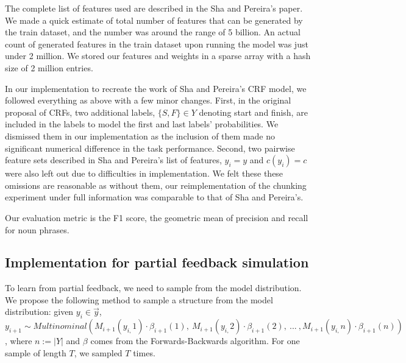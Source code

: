 \documentclass{article}
\begin{document}
The complete list of features used are described in the Sha and Pereira's paper. We made a quick estimate of total number of features that can be generated by the train dataset, and the number was around the range of 5 billion. An actual count of generated features in the train dataset upon running the model was just under 2 million. We stored our features and weights in a sparse array with a hash size of 2 million entries.

In our implementation to recreate the work of Sha and Pereira's CRF model, we followed everything as above with a few minor changes. First, in the original proposal of CRFs, two additional labels, $\{S, F\}\in Y$ denoting start and finish, are included in the labels to model the first and last labels' probabilities.  We dismissed them in our implementation as the inclusion of them made no significant numerical difference in the task performance. Second, two pairwise feature sets described in Sha and Pereira's list of features, $y_{i}=y$ and $c(y_{i})=c$ were also left out due to difficulties in implementation. We felt these these omissions are reasonable as without them, our reimplementation of the chunking experiment under full information was comparable to that of Sha and Pereira's. 

Our evaluation metric is the F1 score, the geometric mean of precision and recall for noun phrases.

\subsection*{Implementation for partial feedback simulation}

To learn from partial feedback, we need to sample from the model distribution. We propose the following method to sample a structure from the model distribution: given $y_{i} \in \vec{y}$, $$y_{i+1}\sim Multinominal\left(M_{i+1}(y_{i,}1)\cdot\beta_{i+1}(1),\: M_{i+1}(y_{i,}2)\cdot\beta_{i+1}(2),\:...\:,M_{i+1}(y_{i,}n)\cdot\beta_{i+1}(n)\right)$$,
 where $n:=|Y|$ and $\beta$ comes from the Forwards-Backwards algorithm. For one sample of length $T$, we sampled $T$ times. 
\end{document}
